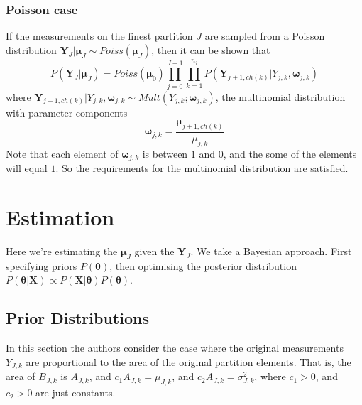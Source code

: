\documentclass[a4paper,12pt]{article}
\theoremstyle{definition}
\begin{document}
\subsubsection{Poisson case}
If the measurements on the finest partition $J$ are sampled from a Poisson distribution $\mathbf{Y}_{J} | \boldsymbol{\mu}_J \sim Poiss(\boldsymbol{\mu}_J)$, then it can be shown that
\begin{equation}
	P(\mathbf{Y}_J | \boldsymbol{\mu}_J) = Poiss(\boldsymbol{\mu}_0) \prod_{j=0}^{J-1} \prod_{k=1}^{n_j} P(\mathbf{Y}_{j+1,ch(k)} | Y_{j,k}, \boldsymbol{\omega}_{j,k})
\end{equation}
where $\mathbf{Y}_{j+1,ch(k)} | Y_{j,k}, \boldsymbol{\omega}_{j,k} \sim Mult(Y_{j,k}; \boldsymbol{\omega}_{j,k})$, the multinomial distribution with parameter components
\begin{equation}
	\boldsymbol{\omega}_{j,k} = \frac{\boldsymbol{\mu}_{j+1,ch(k)}}{\mu_{j,k}}
\end{equation}
Note that each element of $\boldsymbol{\omega}_{j,k}$ is between $1$ and $0$, and the some of the elements will equal $1$. So the requirements for the multinomial distribution are satisfied.

\section{Estimation}
Here we're estimating the $\boldsymbol{\mu}_J$ given the $\mathbf{Y}_{J}$. We take a Bayesian approach. First specifying priors $P(\boldsymbol{\theta})$, then optimising the posterior distribution $P(\boldsymbol{\theta} | \mathbf{X}) \propto P(\mathbf{X} | \boldsymbol{\theta}) P(\boldsymbol{\theta})$.

\subsection{Prior Distributions}
In this section the authors consider the case where the original measurements $Y_{J,k}$ are proportional to the area of the original partition elements. That is, the area of $B_{J,k}$ is $A_{J,k}$, and $c_1 A_{J,k} = \mu_{J,k}$, and $c_2 A_{J,k} = \sigma_{J,k}^2$, where $c_1>0$, and $c_2>0$ are just constants.
\end{document}
